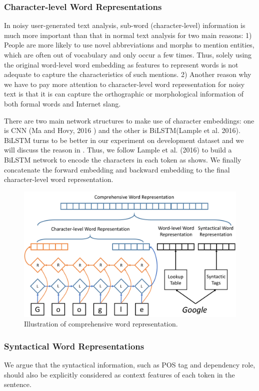 \subsubsection{Character-level Word Representations}
In noisy user-generated text analysis, sub-word (character-level) information is much more important than that in normal text analysis for two main reasons:
1) People are more likely to use novel abbreviations and morphs to mention entities, which are often out of vocabulary and only occur a few times. 
Thus, solely using the original word-level word embedding as features to represent  words is not adequate to capture the characteristics of such mentions.
2) Another reason why we have to pay more attention to character-level word representation for noisy text is that it is can capture the orthographic or morphological information of both formal words and Internet slang. 

There are two main network structures to make use of character embeddings: 
one is CNN (Ma and Hovy, 2016 \cite{} ) and the other is BiLSTM(Lample et al. 2016).
BiLSTM turns to be better in our experiment on development dataset and we will discuss the reason in .
Thus, we follow Lample et al. (2016) to build a BiLSTM network to encode the characters in each token as  shows.
We finally concatenate the forward embedding and backward embedding to the final character-level word representation.
\begin{figure}[th!]
	\includegraphics[width=\columnwidth]{figures/comprehensive}
	\caption{Illustration of comprehensive word representation.}
	\label{fig:comprehensive}
\end{figure}
\subsubsection{Syntactical Word Representations}
We argue that the syntactical information, such as POS tag and dependency role, should also be explicitly considered as context features of each token in the sentence. 

